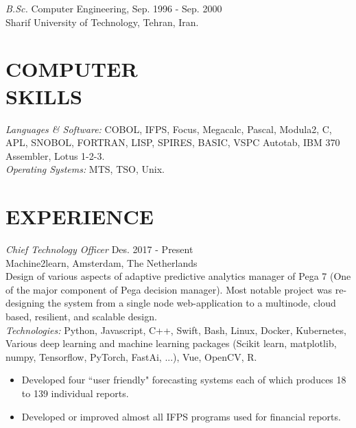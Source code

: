 \documentclass[margin]{res}
\begin{document}
\begin{resume}
	{\sl B.Sc. } Computer Engineering,  \hfill Sep. 1996 - Sep. 2000 \\
 		Sharif University of Technology, Tehran, Iran.
 

 
\section{COMPUTER \\ SKILLS} {\sl Languages \& Software:} COBOL, IFPS, Focus, 
         Megacalc, Pascal, Modula2, C, APL, SNOBOL, 
                FORTRAN, LISP, SPIRES, BASIC, VSPC Autotab, 
                IBM 370 Assembler, Lotus 1-2-3. \\
                {\sl Operating Systems:} MTS, TSO, Unix. 
 
\section{EXPERIENCE} 

 		{\sl Chief Technology Officer} \hfill Des. 2017 - Present \\
		Machine2learn, Amsterdam, The Netherlands \\
		Design of various aspects of adaptive predictive analytics manager of Pega 7 (One of the major component of Pega decision manager). 
		Most notable project was re- designing the system from a single node web-application to a multinode, cloud based, resilient, and scalable design. \\
		\emph{Technologies:} Python, Javascript, C++, Swift, Bash, Linux, Docker, Kubernetes, Various deep learning and machine learning packages (Scikit learn, matplotlib, numpy, Tensorflow, PyTorch, FastAi, ...), Vue, OpenCV, R.
                 \begin{itemize}  \itemsep -2pt %
                 \item Developed four ``user friendly" forecasting 
                    systems each of which produces 18 to 139 
                    individual reports. 
                \item   Developed or improved almost all IFPS 
                    programs used for financial reports. 
                \end{itemize}



\end{resume}
\end{document}
